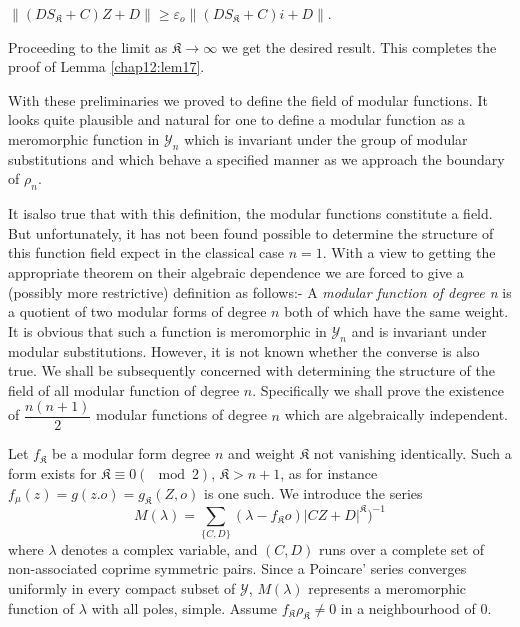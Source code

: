 	$\| (DS_{\mathfrak{K}}+  C) Z+D \| \ge \varepsilon_o \|
(DS_{\mathfrak{K}}+C) i+ D \|$. 

	Proceeding to the limit as $\mathfrak{K} \to \infty$ we get the
        desired result. This completes the proof  of Lemma \ref{chap12:lem17}. 

	With these preliminaries we proved to define the field of
        modular functions. It looks  quite  plausible and natural 
        for one to define a modular function  as a meromorphic
        function in $\mathscr{Y}_n$ which is invariant under the group
        of modular substitutions and which behave a specified manner as
        we approach the boundary of $\rho_n$. 

	It is\pageoriginale also true that with this definition, the
        modular 
        functions constitute a field. But unfortunately, it has not
        been found possible to determine  the structure of this
        function field expect in the classical case $n=1$. With  a
        view to getting the  appropriate theorem on their algebraic
        dependence we are forced  to give a (possibly more
        restrictive) definition as follows:- A \textit{modular
          function of degree n} is a quotient of two modular forms of
        degree $n$ both of which have the same weight. It is obvious
        that such a function  is meromorphic in $\mathscr{Y}_n$ and is
        invariant under modular  substitutions. However, it is not
        known  whether  the converse is also true. We shall be
        subsequently concerned with  determining the structure  of the
        field of all  modular function of degree $n$. Specifically we
        shall prove the  existence  of  $\dfrac{n(n+1)}{2}$ modular
        functions of degree $n$ which are algebraically independent. 

	Let $f_{\mathfrak{K}}$ be a modular form degree $n$ and weight
        $\mathfrak{K}$ not vanishing identically. Such a  form exists
        for  $\mathfrak{K} 
        \equiv 0(\mod 2)$, $\mathfrak{K} > n+1$, as for instance $f_\mu (z) =
        g(z.o) =g _\mathfrak{K}(Z,o)$ is one such. We introduce the
        series 
	\begin{equation*}
	M(\lambda )= \sum_{\{ C,D\}} ( \lambda- f_\mathfrak{K}o) |C
        Z+D|^{\mathfrak{K}})^{-1} \tag{202}\label{eq202}  
	\end{equation*}
	where $\lambda$ denotes a complex variable, and $(C,D)$ runs
        over a complete set of non-associated coprime symmetric
        pairs. Since a Poincare' series converges uniformly in every
        compact  subset of $\mathscr{Y}$, $M (\lambda)$ represents  a
        meromorphic function of $\lambda$ with  all poles,
        simple. Assume $f_\mathfrak{K} \rho_{\mathfrak{K}} \neq 0$ in
        a neighbourhood of 0.  

